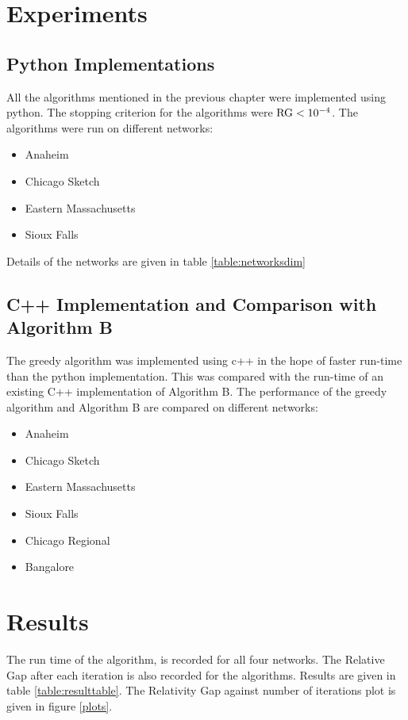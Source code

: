 \section{Experiments}

\subsection{Python Implementations}
All the algorithms mentioned in the previous chapter were implemented
using python. The stopping criterion for the algorithms were
$\hbox{RG}<10^{-4}$. The algorithms were run on different networks:

\begin{itemize}
	\item Anaheim
	\item Chicago Sketch
	\item Eastern Massachusetts
	\item Sioux Falls
\end{itemize}

Details of the networks are given in table \ref{table:networksdim}

\subsection{C++ Implementation and Comparison with Algorithm B}
The greedy algorithm was implemented using c++ in the hope of
faster run-time than the python implementation. This was compared
with the run-time of an existing C++ implementation of Algorithm B.
The performance of the greedy algorithm and Algorithm B are compared
on different networks:

\begin{itemize}
	\item Anaheim
	\item Chicago Sketch
	\item Eastern Massachusetts
	\item Sioux Falls
	\item Chicago Regional
	\item Bangalore
\end{itemize}





\section{Results}
The run time of the algorithm, is recorded for all four networks.
The Relative Gap after each iteration is also recorded for the algorithms.
Results are given in table \ref{table:resulttable}. The Relativity Gap
against number of iterations plot is given in figure \ref{plots}.


